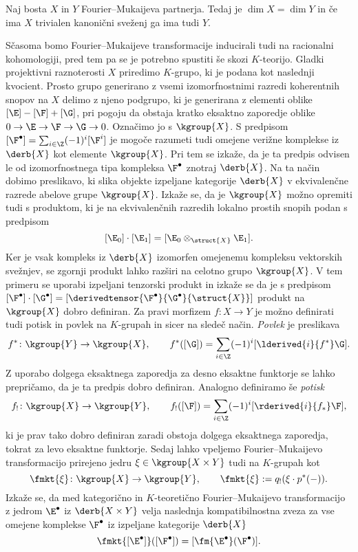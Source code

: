 \begin{izrek}
    Naj bosta $X$ in $Y$ Fourier--Mukaijeva partnerja. Tedaj je $\dim X = \dim Y$ in če ima $X$ trivialen kanonični sveženj ga ima tudi $Y$. 
\end{izrek}

Sčasoma bomo Fourier--Mukaijeve transformacije inducirali tudi na racionalni kohomologiji, pred tem pa se je potrebno spustiti še skozi $K$-teorijo. Gladki projektivni raznoterosti $X$ priredimo $K$-grupo, ki je podana kot naslednji kvocient. Prosto grupo generirano z vsemi izomorfnostnimi razredi koherentnih snopov na $X$ delimo z njeno podgrupo, ki je generirana z elementi oblike $[\E] - [\F] + [\G]$, pri pogoju da obstaja kratko eksaktno zaporedje oblike $0 \to \E \to \F \to \G \to 0$. Označimo jo s $\kgroup{X}$. S predpisom $[\F^\bullet] = \sum_{i \in \Z} (-1)^i[\F^i]$ je mogoče razumeti tudi omejene verižne komplekse iz $\derb{X}$ kot elemente $\kgroup{X}$. Pri tem se izkaže, da je ta predpis odvisen le od izomorfnostnega tipa kompleksa $\F^\bullet$ znotraj $\derb{X}$. Na ta način dobimo preslikavo, ki slika objekte izpeljane kategorije $\derb{X}$ v ekvivalenčne razrede abelove grupe $\kgroup{X}$. Izkaže se, da je $\kgroup{X}$ možno opremiti tudi s produktom, ki je na ekvivalenčnih razredih lokalno prostih snopih podan s predpisom 
\[
    [\E_0] \cdot [\E_1] = [\E_0 \otimes_{\struct{X}} \E_1].
\]
Ker je vsak kompleks iz $\derb{X}$ izomorfen omejenemu kompleksu vektorskih svežnjev, se zgornji produkt lahko razširi na celotno grupo $\kgroup{X}$. V tem primeru se uporabi izpeljani tenzorski produkt in izkaže se da je s predpisom $[\F^\bullet]\cdot [\G^\bullet] = [\derivedtensor{\F^\bullet}{\G^\bullet}{\struct{X}}]$ produkt na $\kgroup{X}$ dobro definiran. 
Za pravi morfizem $f \colon X \to Y$ je možno definirati tudi potisk in povlek na $K$-grupah in sicer na sledeč način. 
\emph{Povlek} je preslikava
\[
    f^* \colon \kgroup{Y} \to \kgroup{X}, \qquad f^*([\G]) = \sum_{i \in \Z}(-1)^i[\lderived{i}{f^*}\G].
\]
Z uporabo dolgega eksaktnega zaporedja za desno eksaktne funktorje se lahko prepričamo, da je ta predpis dobro definiran. Analogno definiramo še \emph{potisk}
\[
    f_! \colon \kgroup{X} \to \kgroup{Y}, \qquad f_!([\F]) = \sum_{i \in \Z}(-1)^i[\rderived{i}{f_*}\F],
\]
ki je prav tako dobro definiran zaradi obstoja dolgega eksaktnega zaporedja, tokrat za levo eksaktne funktorje. Sedaj lahko vpeljemo Fourier--Mukaijevo transformacijo prirejeno jedru $\xi \in \kgroup{X \times Y}$ tudi na $K$-grupah kot
\[
    \fmkt{\xi} \colon \kgroup{X} \to \kgroup{Y}, \qquad \fmkt{\xi} := q_!(\xi \cdot p^*(-)).
\]
Izkaže se, da med kategorično in $K$-teoretično Fourier--Mukaijevo transformacijo z jedrom $\E^\bullet$ iz $\derb{X \times Y}$ velja naslednja kompatibilnostna zveza za vse omejene komplekse $\F^\bullet$ iz izpeljane kategorije $\derb{X}$
\[
    \fmkt{[\E^\bullet]}([\F^\bullet]) = [\fm{\E^\bullet}(\F^\bullet)].
\]

